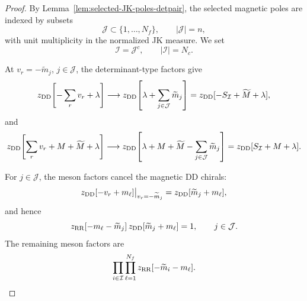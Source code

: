 \documentclass[11pt,a4paper]{article}
\numberwithin{equation}{section}
\theoremstyle{plain}
\theoremstyle{definition}
\theoremstyle{remark}
\begin{document}
\begin{proof}
By Lemma~\ref{lem:selected-JK-poles-detpair}, the selected magnetic poles are indexed by subsets
\begin{equation}
\mathcal J\subset\{1,\ldots,N_f\},
\qquad
|\mathcal J|=n,
\end{equation}
with unit multiplicity in the normalized JK measure.  We set
\begin{equation}
\mathcal I=\mathcal J^c,
\qquad
|\mathcal I|=N_c .
\end{equation}

At \(v_r=-\widetilde m_j\), \(j\in\mathcal J\), the determinant-type factors give
\begin{equation}
z_{\rm DD}\!\left[-\sum_r v_r+\lambda\right]
\longrightarrow
z_{\rm DD}\!\left[\lambda+\sum_{j\in\mathcal J}\widetilde m_j\right]
=
z_{\rm DD}[-S_{\mathcal I}+\widetilde M+\lambda],
\end{equation}
and
\begin{equation}
z_{\rm DD}\!\left[\sum_r v_r+M+\widetilde M+\lambda\right]
\longrightarrow
z_{\rm DD}\!\left[\lambda+M+\widetilde M-\sum_{j\in\mathcal J}\widetilde m_j\right]
=
z_{\rm DD}[S_{\mathcal I}+M+\lambda].
\end{equation}

For \(j\in\mathcal J\), the meson factors cancel the magnetic DD chirals:
\begin{equation}
z_{\rm DD}[-v_r+m_\ell]\big|_{v_r=-\widetilde m_j}
=
z_{\rm DD}[\widetilde m_j+m_\ell],
\end{equation}
and hence
\begin{equation}
z_{\rm RR}[-m_\ell-\widetilde m_j]\,
z_{\rm DD}[\widetilde m_j+m_\ell]=1,
\qquad j\in\mathcal J .
\end{equation}
The remaining meson factors are
\begin{equation}
\prod_{i\in\mathcal I}\prod_{\ell=1}^{N_f}
z_{\rm RR}[-\widetilde m_i-m_\ell].
\label{eq:UNc-reint-meson-leftover}
\end{equation}


\end{proof}
\end{document}
